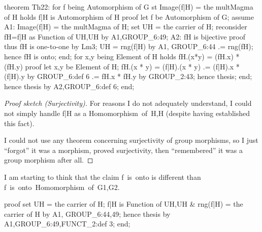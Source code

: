 \nwenddocs{}\endmoddef\nwstartdeflinemarkup{}\nwenddeflinemarkup
theorem Th22:
  for f being Automorphism of G
  st Image(f|H) = the multMagma of H
  holds f|H is Automorphism of H
proof
  let f be Automorphism of G;
  assume A1: Image(f|H) = the multMagma of H;
  set UH = the carrier of H;
  reconsider fH=f|H as Function of UH,UH by A1,GROUP_6:49;
  A2: fH is bijective
  proof
    thus fH is one-to-one by Lm3;
    UH = rng(f|H) by A1, GROUP_6:44
      .= rng(fH);
    hence fH is onto;
  end;
  for x,y being Element of H holds fH.(x*y) = (fH.x) * (fH.y)
  proof
    let x,y be Element of H;
    fH.(x * y) = (f|H).(x * y)
              .= (f|H).x * (f|H).y by GROUP_6:def 6
              .= fH.x * fH.y by GROUP_2:43;
    hence thesis;
  end;
  hence thesis by A2,GROUP_6:def 6;
end;
\eatline
{}\nwendcode{}\nwdocspar
\begin{proof}[Proof sketch (Surjectivity)]
For reasons I do not adequately understand, I could not simply handle
{\Tt{}f|H\nwendquote} as a {\Tt{}Homomorphism\ of\ H,H\nwendquote} (despite having established this
fact).

I could not use any theorem concerning surjectivity of group morphisms,
so I just ``forgot'' it was a morphism, proved surjectivity, then
``remembered'' it was a group morphism after all.
\end{proof}

\begin{thm-remark}
I am starting to think that the claim {\Tt{}f\ is\ onto\nwendquote} is different than
{\Tt{}f\ is\ onto\ Homomorphism\ of\ G1,G2\nwendquote}.
\end{thm-remark}

\nwenddocs{}\endmoddef\nwstartdeflinemarkup\nwenddeflinemarkup
proof
  set UH = the carrier of H;
  f|H is Function of UH,UH & rng(f|H) = the carrier of H by A1, GROUP_6:44,49;
  hence thesis by A1,GROUP_6:49,FUNCT_2:def 3;
end;
\nwendcode{}\nwdocspar

